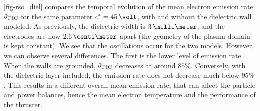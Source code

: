  \cref{fig-rso_diel} compares the temporal evolution of the mean electron emission rate $ \bar{\sigma }_{\rm PIC}$ for the same parameter $\crover=45\,\volt$, with and without the dielectric wall modeled.
  As previously, the dielectric width is $3\,\milli\meter$, and the electrodes are now $2.6\,\centi\meter$ apart (the geometry of the plasma domain is kept constant).
  We see that the oscillations occur for the two models.
  However, we can observe several differences.
  The first is the lower level of emission rate.
  When the walls are grounded, $ \bar{\sigma }_{\rm PIC}$ decreases at around $85\%$.
  Conversely, with the dielectric layer included, the emission rate does not decrease much below $95\%$.
  This results in a different overall mean emission rate, that can affect the particle and power balances, hence the mean electron temperature and the performance of the thruster.
  
  
  
  
  